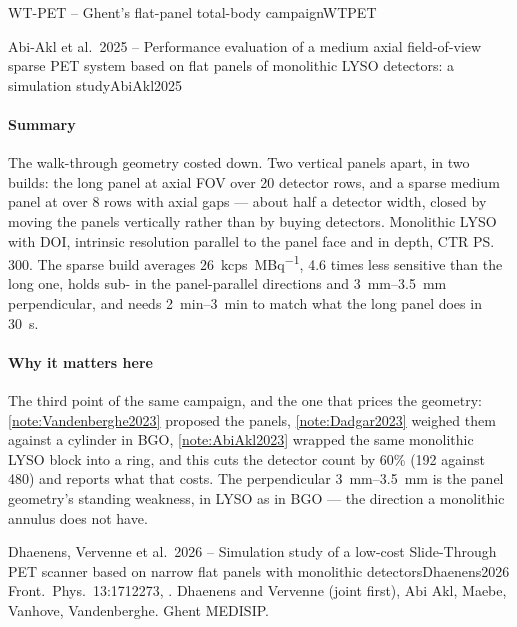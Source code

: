 \begin{programnote}{WT-PET -- Ghent's flat-panel total-body campaign}{WTPET}
\begin{papernote}{Abi-Akl et al.\ 2025 -- Performance evaluation of a medium axial field-of-view sparse PET system based on flat panels of monolithic LYSO detectors: a simulation study}{AbiAkl2025}
\paragraph{Summary}
The walk-through geometry costed down. Two vertical panels  apart, in
two builds: the long panel at  axial FOV over 20 detector rows, and a
sparse medium panel at  over 8 rows with  axial gaps --- about
half a detector width, closed by moving the panels vertically rather than by
buying detectors. Monolithic LYSO  with DOI,
intrinsic resolution  parallel to the panel face and  in
depth, CTR \ps{300}. The sparse build averages
\qty{26}{\kilo cps\per\mega\becquerel}, \num{4.6} times less sensitive than
the long one, holds sub- in the panel-parallel directions and
\qtyrange{3}{3.5}{\mm} perpendicular, and needs \qtyrange{2}{3}{\minute} to
match what the long panel does in \qty{30}{\second}.

\paragraph{Why it matters here}
The third point of the same campaign, and the one that prices the geometry:
\ref{note:Vandenberghe2023} proposed the panels, \ref{note:Dadgar2023} weighed
them against a cylinder in BGO, \ref{note:AbiAkl2023} wrapped the same
monolithic LYSO block into a ring, and this cuts the detector count by 60\%
(192 against 480) and reports what that costs. The perpendicular \qtyrange{3}{3.5}{\mm} is the
panel geometry's standing weakness, in LYSO as in BGO --- the direction a
monolithic annulus does not have.

\end{papernote}

\begin{papernote}{Dhaenens, Vervenne et al.\ 2026 -- Simulation study of a low-cost Slide-Through PET scanner based on narrow flat panels with monolithic detectors}{Dhaenens2026}
Front.\ Phys.\ 13:1712273, . Dhaenens and
Vervenne (joint first), Abi Akl, Maebe, Vanhove, Vandenberghe. Ghent MEDISIP.


\end{papernote}
\end{programnote}
